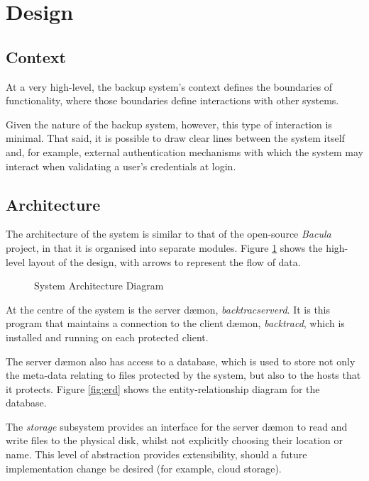 \section{Design}

\subsection{Context}

At a very high-level, the backup system's context defines the boundaries of
functionality, where those boundaries define interactions with other systems.

Given the nature of the backup system, however, this type of interaction is
minimal. That said, it is possible to draw clear lines between the system
itself and, for example, external authentication mechanisms with which the
system may interact when validating a user's credentials at login.

\subsection{Architecture}

The architecture of the system is similar to that of the open-source
\emph{Bacula} project, in that it is organised into separate modules. Figure
\ref{fig:architecture} shows the high-level layout of the design, with arrows
to represent the flow of data.

\begin{figure}[h]
    \begin{center}
        
    \end{center}
    \caption{System Architecture Diagram}
    \label{fig:architecture}
\end{figure}

At the centre of the system is the server d{\ae}mon, \emph{backtracserverd}.
It is this program that maintains a connection to the client d{\ae}mon,
\emph{backtracd}, which is installed and running on each protected client.

The server d{\ae}mon also has access to a database, which is used to store not
only the meta-data relating to files protected by the system, but also to the
hosts that it protects. Figure \ref{fig:erd} shows the entity-relationship
diagram for the database.

The \emph{storage} subsystem provides an interface for the server d{\ae}mon to
read and write files to the physical disk, whilst not explicitly choosing their
location or name. This level of abstraction provides extensibility, should
a future implementation change be desired (for example, cloud storage).

